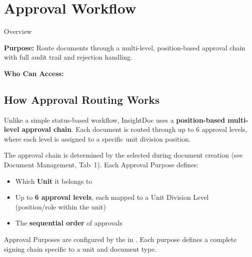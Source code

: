 \section{Approval Workflow}

\begin{ugModule}{Overview}

  \textbf{Purpose:}
  Route documents through a multi-level, position-based
  approval chain with full audit trail and rejection handling.

  \textbf{Who Can Access:}
    
\end{ugModule}

\subsection{How Approval Routing Works}

Unlike a simple status-based workflow, InsightDoc uses a
\textbf{position-based multi-level approval chain}. Each
document is routed through up to 6 approval levels, where
each level is assigned to a specific unit division position.

The approval chain is determined by the  selected during document creation (see
Document Management, Tab~1). Each Approval Purpose defines:

\begin{itemize}[leftmargin=18pt]
  \item Which \textbf{Unit} it belongs to
  \item Up to \textbf{6 approval levels}, each mapped to a
        Unit Division Level (position/role within the unit)
  \item The \textbf{sequential order} of approvals
\end{itemize}

\begin{ugNote}
  Approval Purposes are configured by the  in
  . Each purpose defines a complete signing chain
  specific to a unit and document type.
\end{ugNote}


